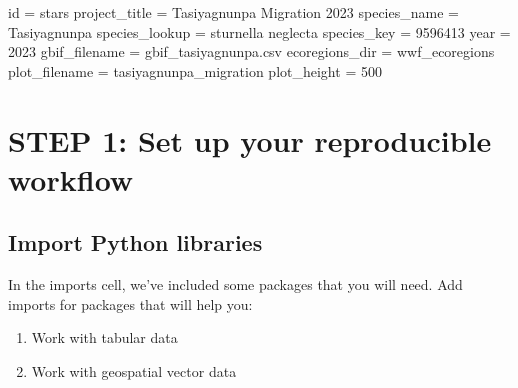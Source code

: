 \documentclass[
  letterpaper,
  DIV=11,
  numbers=noendperiod,
  oneside]{scrreprt}
\newenvironment{Shaded}{\begin{snugshade}}{\end{snugshade}}
\newcommand{\BuiltInTok}[1]{\textcolor[rgb]{0.00,0.23,0.31}{#1}}
\newcommand{\DecValTok}[1]{\textcolor[rgb]{0.68,0.00,0.00}{#1}}
\newcommand{\NormalTok}[1]{\textcolor[rgb]{0.00,0.23,0.31}{#1}}
\newcommand{\OperatorTok}[1]{\textcolor[rgb]{0.37,0.37,0.37}{#1}}
\newcommand{\StringTok}[1]{\textcolor[rgb]{0.13,0.47,0.30}{#1}}
\providecommand{\tightlist}{%
  \setlength{\itemsep}{0pt}\setlength{\parskip}{0pt}}
\begin{document}
\begin{Shaded}
\begin{Highlighting}[]
\BuiltInTok{id} \OperatorTok{=} \StringTok{\textquotesingle{}stars\textquotesingle{}}
\NormalTok{project\_title }\OperatorTok{=} \StringTok{\textquotesingle{}Tasiyagnunpa Migration 2023\textquotesingle{}}
\NormalTok{species\_name }\OperatorTok{=} \StringTok{\textquotesingle{}Tasiyagnunpa\textquotesingle{}}
\NormalTok{species\_lookup }\OperatorTok{=} \StringTok{\textquotesingle{}sturnella neglecta\textquotesingle{}}
\NormalTok{species\_key }\OperatorTok{=} \DecValTok{9596413}
\NormalTok{year }\OperatorTok{=} \DecValTok{2023}
\NormalTok{gbif\_filename }\OperatorTok{=} \StringTok{\textquotesingle{}gbif\_tasiyagnunpa.csv\textquotesingle{}}
\NormalTok{ecoregions\_dir }\OperatorTok{=} \StringTok{\textquotesingle{}wwf\_ecoregions\textquotesingle{}}
\NormalTok{plot\_filename }\OperatorTok{=} \StringTok{\textquotesingle{}tasiyagnunpa\_migration\textquotesingle{}}
\NormalTok{plot\_height }\OperatorTok{=} \DecValTok{500}
\end{Highlighting}
\end{Shaded}

\section{STEP 1: Set up your reproducible
workflow}\label{step-1-set-up-your-reproducible-workflow}

\subsection{Import Python libraries}\label{import-python-libraries}

\begin{tcolorbox}[enhanced jigsaw, colbacktitle=quarto-callout-color!10!white, opacityback=0, bottomtitle=1mm, toptitle=1mm, bottomrule=.15mm, left=2mm, colframe=quarto-callout-color-frame, leftrule=.75mm, opacitybacktitle=0.6, colback=white, rightrule=.15mm, toprule=.15mm, breakable, titlerule=0mm, title=\textcolor{quarto-callout-color}{\faInfo}\hspace{0.5em}{Try It: Import packages}, coltitle=black, arc=.35mm]

In the imports cell, we've included some packages that you will need.
Add imports for packages that will help you:

\begin{enumerate}
\def\labelenumi{\arabic{enumi}.}
\tightlist
\item
  Work with tabular data
\item
  Work with geospatial vector data
\end{enumerate}

\end{tcolorbox}
\end{document}
